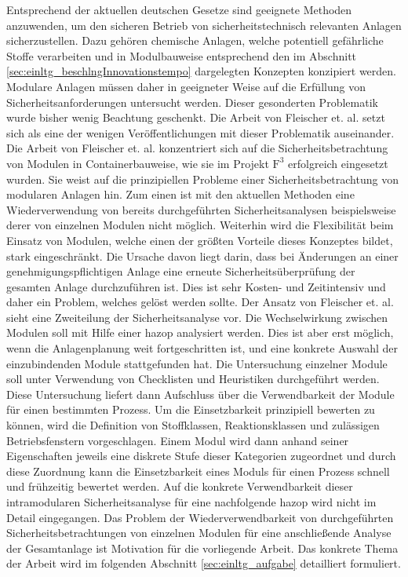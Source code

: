 Entsprechend der aktuellen deutschen Gesetze sind geeignete Methoden anzuwenden, um den sicheren Betrieb von sicherheitstechnisch relevanten Anlagen sicherzustellen. Dazu geh\"oren  chemische Anlagen, welche potentiell gef\"ahrliche Stoffe verarbeiten und in Modulbauweise entsprechend den im Abschnitt \ref{sec:einltg_beschlngInnovationstempo} dargelegten Konzepten konzipiert werden. Modulare Anlagen m\"ussen daher in geeigneter Weise auf die Erf\"ullung von Sicherheitsanforderungen untersucht werden. Dieser gesonderten Problematik wurde bisher wenig Beachtung geschenkt. Die Arbeit von Fleischer et. al. \cite{Fleischer_2015} setzt sich als eine der wenigen Ver\"offentlichungen mit dieser Problematik auseinander. Die Arbeit von Fleischer et. al. konzentriert sich auf die Sicherheitsbetrachtung von Modulen in Containerbauweise, wie sie im Projekt $\text{F}^{3}$ erfolgreich eingesetzt wurden. Sie weist auf die prinzipiellen Probleme einer Sicherheitsbetrachtung von modularen Anlagen hin. Zum einen ist mit den aktuellen Methoden eine Wiederverwendung von bereits durchgef\"uhrten Sicherheitsanalysen beispielsweise derer von einzelnen Modulen nicht m\"oglich. Weiterhin wird die Flexibilit\"at beim Einsatz von Modulen, welche einen der gr\"o\ss{}ten Vorteile dieses Konzeptes bildet, stark eingeschr\"ankt. Die Ursache davon liegt darin, dass bei \"Anderungen an einer genehmigungspflichtigen Anlage eine erneute Sicherheits\"uberpr\"ufung der gesamten Anlage durchzuf\"uhren ist. Dies ist sehr Kosten- und Zeitintensiv und daher ein Problem, welches gel\"ost werden sollte. \linebreak
Der Ansatz von Fleischer et. al. sieht eine Zweiteilung der Sicherheitsanalyse vor. Die Wechselwirkung zwischen Modulen soll mit Hilfe einer \ac{hazop} analysiert werden. Dies ist aber erst m\"oglich, wenn die Anlagenplanung weit fortgeschritten ist, und eine konkrete Auswahl der einzubindenden Module stattgefunden hat. Die Untersuchung einzelner Module soll unter Verwendung von Checklisten und Heuristiken durchgef\"uhrt werden. Diese Untersuchung  liefert dann Aufschluss \"uber die Verwendbarkeit der Module f\"ur einen bestimmten Prozess. Um die Einsetzbarkeit prinzipiell bewerten zu k\"onnen, wird die Definition von Stoffklassen, Reaktionsklassen und zul\"assigen Betriebsfenstern vorgeschlagen. Einem Modul wird dann anhand seiner Eigenschaften jeweils eine diskrete Stufe dieser Kategorien zugeordnet und durch diese Zuordnung kann die Einsetzbarkeit eines Moduls f\"ur einen Prozess schnell und fr\"uhzeitig bewertet werden. Auf die konkrete Verwendbarkeit dieser intramodularen Sicherheitsanalyse f\"ur eine nachfolgende \ac{hazop} wird nicht im Detail eingegangen. Das Problem der Wiederverwendbarkeit von durchgef\"uhrten Sicherheitsbetrachtungen von einzelnen Modulen f\"ur eine anschlie\ss{}ende Analyse der Gesamtanlage ist Motivation f\"ur die vorliegende Arbeit. Das konkrete Thema der Arbeit wird im folgenden Abschnitt \ref{sec:einltg_aufgabe} detailliert formuliert.

